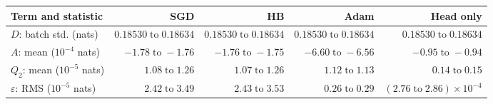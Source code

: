\begin{tabular}{lrrrr}
\toprule
Term and statistic & SGD & HB & Adam & Head only \\
\midrule
$D$: batch std. (nats) & $0.18530\;\text{to}\;0.18634$ & $0.18530\;\text{to}\;0.18634$ & $0.18530\;\text{to}\;0.18634$ & $0.18530\;\text{to}\;0.18634$ \\
$A$: mean ($10^{-4}$ nats) & $-1.78\;\text{to}\;-1.76$ & $-1.76\;\text{to}\;-1.75$ & $-6.60\;\text{to}\;-6.56$ & $-0.95\;\text{to}\;-0.94$ \\
$Q_2$: mean ($10^{-5}$ nats) & $1.08\;\text{to}\;1.26$ & $1.07\;\text{to}\;1.26$ & $1.12\;\text{to}\;1.13$ & $0.14\;\text{to}\;0.15$ \\
$\varepsilon$: RMS ($10^{-5}$ nats) & $2.42\;\text{to}\;3.49$ & $2.43\;\text{to}\;3.53$ & $0.26\;\text{to}\;0.29$ & $(2.76\;\text{to}\;2.86)\!\times\!10^{-4}$ \\
\bottomrule
\end{tabular}
